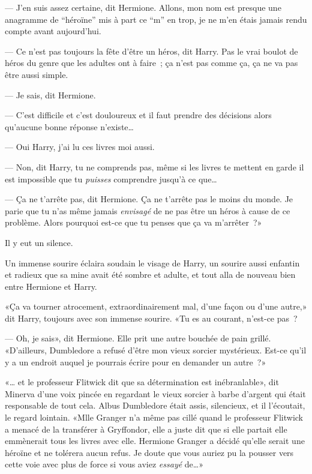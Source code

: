 --- J'en suis assez certaine, dit Hermione. Allons, mon nom est presque une anagramme de “héroïne” mis à part ce “m” en trop, je ne m'en étais jamais rendu compte avant aujourd'hui.

--- Ce n'est pas toujours la fête d'être un héros, dit Harry. Pas le vrai boulot de héros du genre que les adultes ont à faire~; ça n'est pas comme ça, ça ne va pas être aussi simple.

--- Je sais, dit Hermione.

--- C'est difficile et c'est douloureux et il faut prendre des décisions alors qu'aucune bonne réponse n'existe…

--- Oui Harry, j'ai lu ces livres moi aussi.

--- Non, dit Harry, tu ne comprends pas, même si les livres te mettent en garde il est impossible que tu \emph{puisses} comprendre jusqu'à ce que…

--- Ça ne t'arrête pas, dit Hermione. Ça ne t'arrête pas le moins du monde. Je parie que tu n'as même jamais \emph{envisagé} de ne pas être un héros à cause de ce problème. Alors pourquoi est-ce que tu penses que ça va m'arrêter~?»

Il y eut un silence.

Un immense sourire éclaira soudain le visage de Harry, un sourire aussi enfantin et radieux que sa mine avait été sombre et adulte, et tout alla de nouveau bien entre Hermione et Harry.

«Ça va tourner atrocement, extraordinairement mal, d'une façon ou d'une autre,» dit Harry, toujours avec son immense sourire. «Tu es au courant, n'est-ce pas~?

--- Oh, je sais», dit Hermione. Elle prit une autre bouchée de pain grillé. «D'ailleurs, Dumbledore a refusé d'être mon vieux sorcier mystérieux. Est-ce qu'il y a un endroit auquel je pourrais écrire pour en demander un autre~?»


«… et le professeur Flitwick dit que sa détermination est inébranlable», dit Minerva d'une voix pincée en regardant le vieux sorcier à barbe d'argent qui était responsable de tout cela. Albus Dumbledore était assis, silencieux, et il l'écoutait, le regard lointain. «Mlle Granger n'a même pas cillé quand le professeur Flitwick a menacé de la transférer à Gryffondor, elle a juste dit que si elle partait elle emmènerait tous les livres avec elle. Hermione Granger a décidé qu'elle serait une héroïne et ne tolérera aucun refus. Je doute que vous auriez pu la pousser vers cette voie avec plus de force si vous aviez \emph{essayé} de…»

